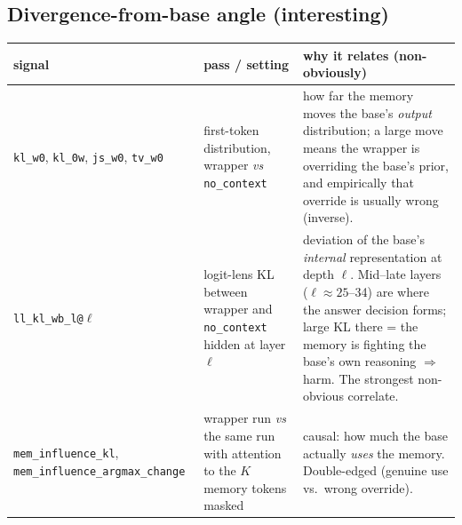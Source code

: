 \documentclass[11pt]{article}
\newcommand{\noctx}{\texttt{no\_context}}
\newcommand{\code}[1]{\texttt{#1}}
\begin{document}
\subsection{Divergence-from-base angle (interesting)}
\begin{center}\footnotesize\begin{tabular}{p{3.0cm} p{3.9cm} p{6.0cm}}
\toprule signal & pass / setting & why it relates (non-obviously)\\ \midrule
\code{kl\_w0}, \code{kl\_0w}, \code{js\_w0}, \code{tv\_w0} & first-token distribution, wrapper \emph{vs} \noctx{} & how far the memory moves the base's \emph{output} distribution; a large move means the wrapper is overriding the base's prior, and empirically that override is usually wrong (inverse).\\
\code{ll\_kl\_wb\_l@$\ell$} & logit-lens KL between wrapper and \noctx{} hidden at layer $\ell$ & deviation of the base's \emph{internal} representation at depth $\ell$. Mid--late layers ($\ell{\approx}25$--34) are where the answer decision forms; large KL there = the memory is fighting the base's own reasoning $\Rightarrow$ harm. The strongest non-obvious correlate.\\
\code{mem\_influence\_kl}, \code{mem\_influence\_argmax\_change} & wrapper run \emph{vs} the same run with attention to the $K$ memory tokens masked & causal: how much the base actually \emph{uses} the memory. Double-edged (genuine use vs.\ wrong override).\\
\bottomrule\end{tabular}\end{center}
\end{document}

